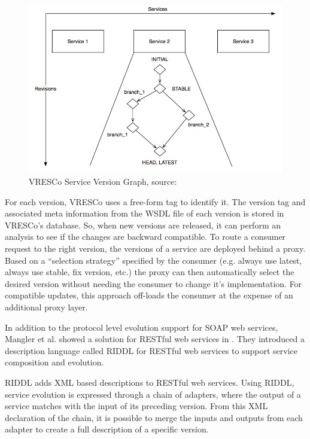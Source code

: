 \documentclass[runningheads,a4paper]{llncs}
\begin{document}
\begin{figure}[ht]
  \centering
  \includegraphics[width=\textwidth]{vresco.png}
    \caption{VRESCo Service Version Graph, source: \cite{leitner2008end}}
  \label{fig:vresco}
\end{figure}


For each version, VRESCo uses a free-form tag to identify it. The version tag and associated meta information from the WSDL file of each version is stored in VRESCo's database. So, when new versions are released, it can perform an analysis to see if the changes are backward compatible. To route a consumer request to the right version, the versions of a service are deployed behind a proxy. Based on a ``selection strategy'' specified by the consumer (e.g. always use latest, always use stable, fix version, etc.) the proxy can then automatically select the desired version without needing the consumer to change it’s implementation. For compatible updates, this approach off-loads the consumer at the expense of an additional proxy layer.

In addition to the protocol level evolution support for SOAP web services, Mangler et al. showed a solution for RESTful web services in \cite{mangler2010origin}. They introduced a description language called RIDDL for RESTful web services to support service composition and evolution.

RIDDL adds XML based descriptions to RESTful web services. Using RIDDL, service evolution is expressed through a chain of adapters, where the output of a service matches with the input of its preceding version. From this XML declaration of the chain, it is possible to merge the inputs and outputs from each adapter to create a full description of a specific version.
\end{document}
